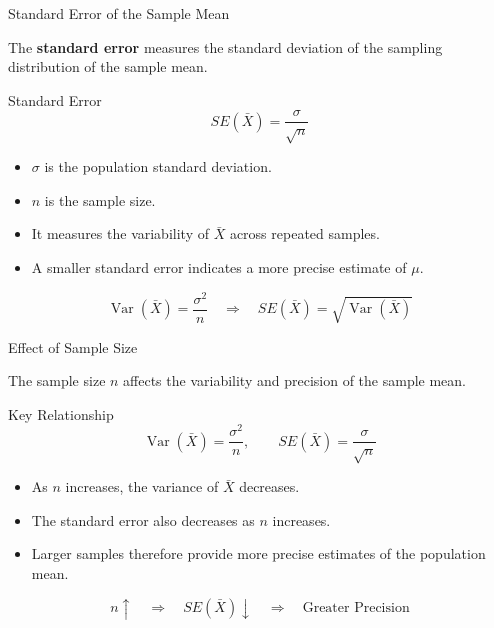 \documentclass{beamer}
\begin{document}

\begin{frame}{Standard Error of the Sample Mean}

The \textbf{standard error} measures the standard deviation
of the sampling distribution of the sample mean.

\begin{block}{Standard Error}
\[
\boxed{
SE(\bar{X})
=
\frac{\sigma}{\sqrt{n}}
}
\]
\end{block}

\begin{itemize}
    \item $\sigma$ is the population standard deviation.
    \item $n$ is the sample size.
    \item It measures the variability of $\bar{X}$ across repeated samples.
    \item A smaller standard error indicates a more precise estimate of $\mu$.
\end{itemize}

\vspace{0.15cm}

\[
\operatorname{Var}(\bar{X})=\frac{\sigma^2}{n}
\quad\Longrightarrow\quad
SE(\bar{X})=\sqrt{\operatorname{Var}(\bar{X})}
\]

\end{frame}


\begin{frame}{Effect of Sample Size}

The sample size $n$ affects the variability and precision
of the sample mean.

\begin{block}{Key Relationship}
\[
\operatorname{Var}(\bar{X})=\frac{\sigma^2}{n},
\qquad
SE(\bar{X})=\frac{\sigma}{\sqrt{n}}
\]
\end{block}

\begin{itemize}
    \item As $n$ increases, the variance of $\bar{X}$ decreases.
    \item The standard error also decreases as $n$ increases.
    \item Larger samples therefore provide more precise estimates
          of the population mean.
\end{itemize}

\begin{center}
\[
\boxed{
n \uparrow
\quad\Longrightarrow\quad
SE(\bar{X}) \downarrow
\quad\Longrightarrow\quad
\text{Greater Precision}
}
\]
\end{center}

\end{frame}
\end{document}
